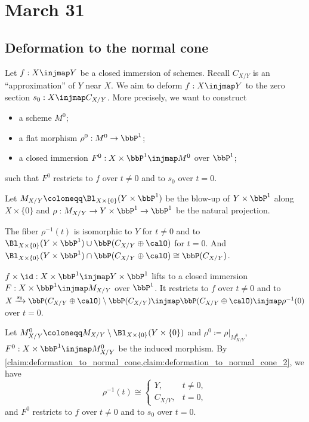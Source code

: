 \section{March 31}


\subsection{Deformation to the normal cone}

  Let $f: X \injmap Y$ be a closed immersion of schemes.
  Recall $C_{X/Y}$ is an ``approximation'' of $Y$ near $X$.
  We aim to deform $f:X \injmap Y$ to the zero section $s_0: X \injmap C_{X/Y}$.
  More precisely, we want to construct 
  \begin{itemize}
    \item a scheme $M^0$;
    \item a flat morphism $\rho^0: M^0 \to \bbP^1$;
    \item a closed immersion $F^0: X \times \bbP^1 \injmap M^0$ over $\bbP^1$;
  \end{itemize}
  such that $F^0$ restricts to $f$ over $t \neq 0$ and to $s_0$ over $t=0$.

  \begin{construction}
    Let $M_{X/Y} \coloneqq \Bl_{X \times \{0\}}(Y \times \bbP^1)$ be the blow-up of $Y \times \bbP^1$ along $X \times \{0\}$ and $\rho: M_{X/Y} \to Y \times \bbP^1 \to \bbP^1$ be the natural projection.
    
    \begin{claim}\label{claim:deformation_to_normal_cone}
      The fiber $\rho^{-1}(t)$ is isomorphic to $Y$ for $t \neq 0$ and to $\Bl_{X \times \{0\}}(Y \times \bbP^1) \cup \bbP(C_{X/Y} \oplus \calO)$ for $t=0$.
      And $\Bl_{X \times \{0\}}(Y \times \bbP^1) \cap \bbP(C_{X/Y} \oplus \calO) \cong \bbP(C_{X/Y})$.
    \end{claim}

    \begin{claim}\label{claim:deformation_to_normal_cone_2}
      $f \times \id: X \times \bbP^1 \injmap Y \times \bbP^1$ lifts to a closed immersion $F: X \times \bbP^1 \injmap M_{X/Y}$ over $\bbP^1$.
      It restricts to $f$ over $t \neq 0$ and to $X \xrightarrow{s_0} \bbP(C_{X/Y} \oplus \calO) \setminus \bbP(C_{X/Y}) \injmap \bbP(C_{X/Y} \oplus \calO) \injmap \rho^{-1}(0)$ over $t=0$.
    \end{claim}

    Let $M^0_{X/Y} \coloneqq M_{X/Y} \setminus \Bl_{X \times \{0\}}(Y \times \{0\})$ and $\rho^0 \coloneqq \rho|_{M^0_{X/Y}}$, $F^0: X \times \bbP^1 \injmap M^0_{X/Y}$ be the induced morphism.
    By \cref{claim:deformation_to_normal_cone,claim:deformation_to_normal_cone_2}, we have 
    \[ \rho^{-1}(t) \cong \begin{cases}
      Y, & t \neq 0, \\
      C_{X/Y}, & t=0,
    \end{cases} \]
    and $F^0$ restricts to $f$ over $t \neq 0$ and to $s_0$ over $t=0$.
  \end{construction}

